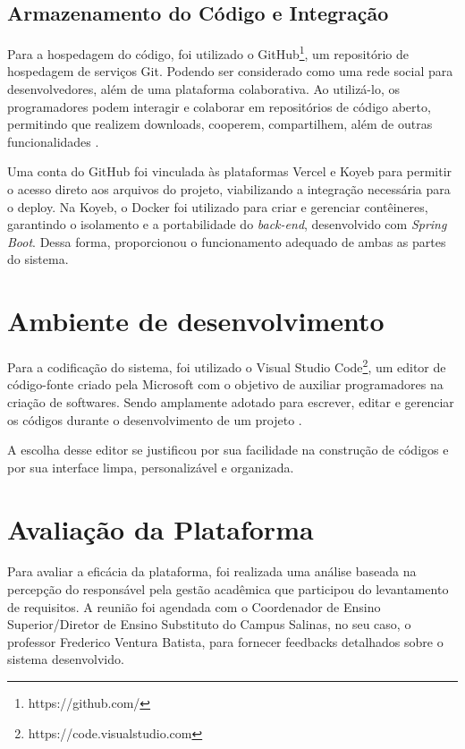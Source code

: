 \subsection{Armazenamento do Código e Integração}

Para a hospedagem do código, foi utilizado o GitHub\footnote{https://github.com/}, um repositório de hospedagem de serviços Git. Podendo ser considerado como uma rede social para desenvolvedores, além de uma plataforma colaborativa. Ao utilizá-lo, os programadores podem interagir e colaborar em repositórios de código aberto, permitindo que realizem downloads, cooperem, compartilhem, além de outras funcionalidades \cite{silva2024biblioteca}.

Uma conta do GitHub foi vinculada às plataformas Vercel e Koyeb para permitir o acesso direto aos arquivos do projeto, viabilizando a integração necessária para o deploy. Na Koyeb, o Docker foi utilizado para criar e gerenciar contêineres, garantindo o isolamento e a portabilidade do \textit{back-end}, desenvolvido com \textit{Spring Boot}. Dessa forma, proporcionou o funcionamento adequado de ambas as partes do sistema.

\section{Ambiente de desenvolvimento}

Para a codificação do sistema, foi utilizado o Visual Studio Code\footnote{https://code.visualstudio.com}, um editor de código-fonte criado pela Microsoft com o objetivo de auxiliar programadores na criação de softwares. Sendo amplamente adotado para escrever, editar e gerenciar os códigos durante o desenvolvimento de um projeto \cite{silva2024biblioteca}.

A escolha desse editor se justificou por sua facilidade na construção de códigos e por sua interface limpa, personalizável e organizada.

\section{Avaliação da Plataforma}

Para avaliar a eficácia da plataforma, foi realizada uma análise baseada na percepção do responsável pela gestão acadêmica que participou do levantamento de requisitos. A reunião foi agendada com o Coordenador de Ensino Superior/Diretor de Ensino Substituto do Campus Salinas, no seu caso, o professor Frederico Ventura Batista, para fornecer feedbacks detalhados sobre o sistema desenvolvido.

